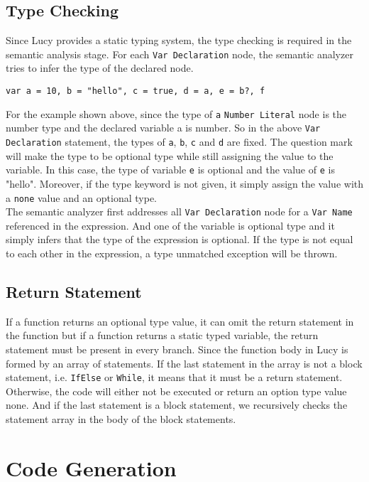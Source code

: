 \subsection{Type Checking}
Since Lucy provides a static typing system, the type checking is required in the semantic analysis stage. For each \texttt{Var Declaration} node, the semantic analyzer tries to infer the type of the declared node.
\begin{lstlisting}
var a = 10, b = "hello", c = true, d = a, e = b?, f
\end{lstlisting}
For the example shown above, since the type of \texttt{a} \texttt{Number Literal} node is the number type and the declared variable a is number. So in the above \texttt{Var Declaration} statement, the types of \texttt{a}, \texttt{b}, \texttt{c} and \texttt{d} are fixed. The question mark will make the type to be optional type while still assigning the value to the variable. In this case, the type of variable \texttt{e} is optional and the value of \texttt{e} is "hello". Moreover, if the type keyword is not given, it simply assign the value with a \texttt{none} value and an optional type. \\
The semantic analyzer first addresses all \texttt{Var Declaration} node for a \texttt{Var Name} referenced in the expression. And one of the variable is optional type and it simply infers that the type of the expression is optional. If the type is not equal to each other in the expression, a type unmatched exception will be thrown.
\subsection{Return Statement}
If a function returns an optional type value, it can omit the return statement in the function but if a function returns a static typed variable, the return statement must be present in every branch. Since the function body in Lucy is formed by an array of statements. If the last statement in the array is not a block statement, i.e. \texttt{IfElse} or \texttt{While}, it means that it must be a return statement. Otherwise, the code will either not be executed or return an option type value none. And if the last statement is a block statement, we recursively checks the statement array in the body of the block statements. 
\section{Code Generation}
